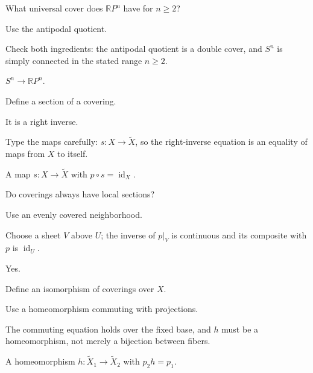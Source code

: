 \begin{exercise}\label{exr:viii10-17}
What universal cover does \(\mathbb RP^n\) have for \(n\ge2\)?
\end{exercise}
\begin{hint}
Use the antipodal quotient.

Check both ingredients: the antipodal quotient is a double cover, and \(S^n\) is simply connected in the stated range \(n\ge2\).
\end{hint}
\begin{solution}
\(S^n\to\mathbb RP^n\).
\end{solution}

\begin{exercise}\label{exr:viii10-18}
Define a section of a covering.
\end{exercise}
\begin{hint}
It is a right inverse.

Type the maps carefully: \(s:X\to\widetilde X\), so the right-inverse equation is an equality of maps from \(X\) to itself.
\end{hint}
\begin{solution}
A map \(s:X\to\widetilde X\) with \(p\circ s=\operatorname{id}_X\).
\end{solution}

\begin{exercise}\label{exr:viii10-19}
Do coverings always have local sections?
\end{exercise}
\begin{hint}
Use an evenly covered neighborhood.

Choose a sheet \(V\) above \(U\); the inverse of \(p|_V\) is continuous and its composite with \(p\) is \(\operatorname{id}_U\).
\end{hint}
\begin{solution}
Yes.
\end{solution}

\begin{exercise}\label{exr:viii10-20}
Define an isomorphism of coverings over \(X\).
\end{exercise}
\begin{hint}
Use a homeomorphism commuting with projections.

The commuting equation holds over the fixed base, and \(h\) must be a homeomorphism, not merely a bijection between fibers.
\end{hint}
\begin{solution}
A homeomorphism \(h:\widetilde X_1\to\widetilde X_2\) with \(p_2h=p_1\).
\end{solution}

